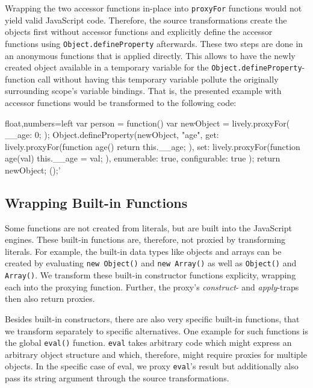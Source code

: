 Wrapping the two accessor functions in-place into \lstinline{proxyFor} functions would not yield valid JavaScript code.
Therefore, the source transformations create the objects first without accessor functions and explicitly define the accessor functions using \lstinline{Object.defineProperty} afterwards.
These two steps are done in an anonymous functions that is applied directly.
This allows to have the newly created object available in a temporary variable for the \lstinline{Object.defineProperty}-function call without having this temporary variable pollute the originally surrounding scope's variable bindings.
That is, the presented example with accessor functions would be transformed to the following code: \\

\iffalse
\begin{verbatim}\fi
\begin{code}{}{float,numbers=left}
var person = function() {
    var newObject = lively.proxyFor({
        __age: 0;
    });
    Object.defineProperty(newObject, "age", {
        get: lively.proxyFor(function age() {
            return this.__age;
        }),
        set: lively.proxyFor(function age(val) {
            this.__age = val;
        }),
        enumerable: true,
        configurable: true
    });
    return newObject;
}();'
\end{code}
\iffalse
\end{verbatim}\fi





\subsection{Wrapping Built-in Functions}

Some functions are not created from literals, but are built into the JavaScript engines.
These built-in functions are, therefore, not proxied by transforming literals.
For example, the built-in data types like objects and arrays can be created by evaluating \lstinline{new Object()} and \lstinline{new Array()} as well as \lstinline{Object()} and \lstinline{Array()}.
We transform these built-in constructor functions explicity, wrapping each into the proxying function.
Further, the proxy's \emph{construct}- and \emph{apply}-traps then also return proxies.

Besides built-in constructors, there are also very specific built-in functions, that we transform separately to specific alternatives.
One example for such functions is the global \lstinline{eval()} function.
\lstinline{eval} takes arbitrary code which might express an arbitrary object structure and which, therefore, might require proxies for multiple objects.
In the specific case of eval, we proxy \lstinline{eval}'s result but additionally also pass its string argument through the source transformations.


